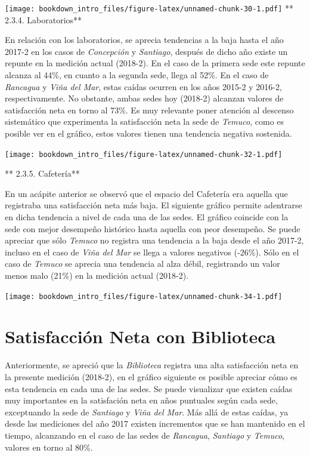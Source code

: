 \documentclass[]{book}
\begin{document}
\texttt{[image: bookdown\_intro\_files/figure-latex/unnamed-chunk-30-1.pdf]}
** 2.3.4. Laboratorios**

En relación con los laboratorios, se aprecia tendencias a la baja hasta
el año 2017-2 en los casos de \emph{Concepción} y \emph{Santiago},
después de dicho año existe un repunte en la medición actual (2018-2).
En el caso de la primera sede este repunte alcanza al 44\%, en cuanto a
la segunda sede, llega al 52\%. En el caso de \emph{Rancagua} y
\emph{Viña del Mar}, estas caídas ocurren en los años 2015-2 y 2016-2,
respectivamente. No obstante, ambas sedes hoy (2018-2) alcanzan valores
de satisfacción neta en torno al 73\%. Es muy relevante poner atención
al descenso sistemático que experimenta la satisfacción neta la sede de
\emph{Temuco}, como es posible ver en el gráfico, estos valores tienen
una tendencia negativa sostenida.

\texttt{[image: bookdown\_intro\_files/figure-latex/unnamed-chunk-32-1.pdf]}

** 2.3.5. Cafetería**

En un acápite anterior se observó que el espacio del Cafetería era
aquella que registraba una satisfacción neta más baja. El siguiente
gráfico permite adentrarse en dicha tendencia a nivel de cada una de las
sedes. El gráfico coincide con la sede con mejor desempeño histórico
hasta aquella con peor desempeño. Se puede apreciar que sólo
\emph{Temuco} no registra una tendencia a la baja desde el año 2017-2,
incluso en el caso de \emph{Viña del Mar} se llega a valores negativos
(-26\%). Sólo en el caso de \emph{Temuco} se aprecia una tendencia al
alza débil, registrando un valor menos malo (21\%) en la medición actual
(2018-2).

\texttt{[image: bookdown\_intro\_files/figure-latex/unnamed-chunk-34-1.pdf]}

\section{Satisfacción Neta con
Biblioteca}\label{satisfaccion-neta-con-biblioteca}

Anteriormente, se apreció que la \emph{Biblioteca} registra una alta
satisfacción neta en la presente medición (2018-2), en el gráfico
siguiente es posible apreciar cómo es esta tendencia en cada una de las
sedes. Se puede visualizar que existen caídas muy importantes en la
satisfación neta en años puntuales según cada sede, exceptuando la sede
de \emph{Santiago} y \emph{Viña del Mar}. Más allá de estas caídas, ya
desde las mediciones del año 2017 existen incrementos que se han
mantenido en el tiempo, alcanzando en el caso de las sedes de
\emph{Rancagua}, \emph{Santiago} y \emph{Temuco}, valores en torno al
80\%.
\end{document}
